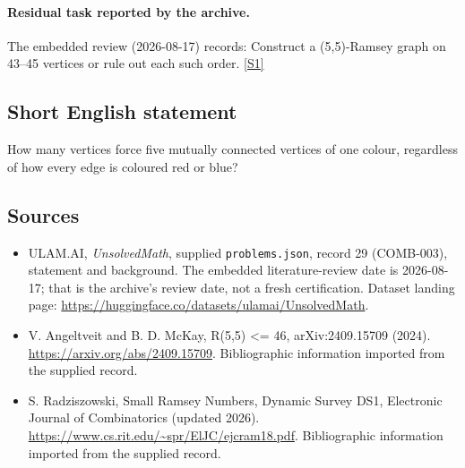\documentclass[11pt,a4paper]{article}
\newcommand{\sref}[2]{\hyperlink{source:#1:#2}{[S#2]}}
\begin{document}
\paragraph{Residual task reported by the archive.}

The embedded review (2026-08-17) records: Construct a (5,5)-Ramsey graph on 43--45 vertices or rule out each such order. \sref{29}{1}

\subsection{Short English statement}

How many vertices force five mutually connected vertices of one colour, regardless of how every edge is coloured red or blue?

\subsection{Sources}

{\small

\begin{itemize}

\item[\hypertarget{source:29:1}{S1}] ULAM.AI, \emph{UnsolvedMath}, supplied \texttt{problems.json}, record 29 (COMB-003), statement and background. The embedded literature-review date is 2026-08-17; that is the archive’s review date, not a fresh certification. Dataset landing page: \url{https://huggingface.co/datasets/ulamai/UnsolvedMath}.

\item[\hypertarget{source:29:2}{S2}] V. Angeltveit and B. D. McKay, R(5,5) <= 46, arXiv:2409.15709 (2024). \url{https://arxiv.org/abs/2409.15709}. Bibliographic information imported from the supplied record.

\item[\hypertarget{source:29:3}{S3}] S. Radziszowski, Small Ramsey Numbers, Dynamic Survey DS1, Electronic Journal of Combinatorics (updated 2026). \url{https://www.cs.rit.edu/~spr/ElJC/ejcram18.pdf}. Bibliographic information imported from the supplied record.

\end{itemize}

}

\label{end:29}
\end{document}
